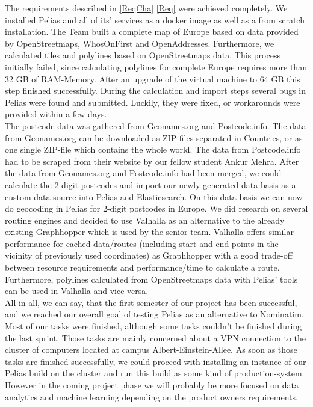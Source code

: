 The requirements described in \cref{ReqCha} \cref{Req} were achieved completely. We installed Pelias and all of its’ services as a docker image as well as a from scratch installation. The Team built a complete map of Europe based on data provided by OpenStreetmaps, WhosOnFirst and OpenAddresses. Furthermore, we calculated tiles and polylines based on OpenStreetmaps data. This process initially failed, since calculating polylines for complete Europe requires more than 32 GB of RAM-Memory. After an upgrade of the virtual machine to 64 GB this step finished successfully. During the calculation and import steps several bugs in Pelias were found and submitted. Luckily, they were fixed, or workarounds were provided within a few days.\\
The postcode data was gathered from Geonames.org and Postcode.info. The data from Geonames.org can be downloaded as ZIP-files separated in Countries, or as one single ZIP-file which contains the whole world. The data from Postcode.info had to be scraped from their website by our fellow student Ankur Mehra. After the data from Geonames.org and Postcode.info had been merged, we could calculate the 2-digit postcodes and import our newly generated data basis as a custom data-source into Pelias and Elasticsearch. On this data basis we can now do geocoding in Pelias for 2-digit postcodes in Europe.
We did research on several routing engines and decided to use Valhalla as an alternative to the already existing Graphhopper which is used by the senior team. Valhalla offers similar performance for cached data/routes (including start and end points in the vicinity of previously used coordinates) as Graphhopper with a good trade-off between resource requirements and performance/time to calculate a route. Furthermore, polylines calculated from OpenStreetmaps data with Pelias' tools can be used in Valhalla and vice versa.\\
All in all, we can say, that the first semester of our project has been successful, and we reached our overall goal of testing Pelias as an alternative to Nominatim. Most of our tasks were finished, although some tasks couldn’t be finished during the last sprint. Those tasks are mainly concerned about a VPN connection to the cluster of computers located at campus Albert-Einstein-Allee. As soon as those tasks are finished successfully, we could proceed with installing an instance of our Pelias build on the cluster and run this build as some kind of production-system. However in the coming project phase we will probably be more focused on data analytics and machine learning depending on the product owners requirements.